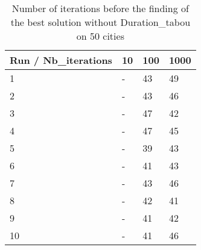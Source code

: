 \documentclass[12pt,oneside,a4paper]{article}
\begin{document}
    \begin{table}[h]
        \centering
        \small
        \begin{tabular}{llll}
          \hline
          \multicolumn{1}{|l|}{\textbf{Run / Nb\_iterations}}& \multicolumn{1}{l|}{\textbf{10}} & \multicolumn{1}{l|}{\textbf{100}} & \multicolumn{1}{l|}{\textbf{1000}}\\ \hline
          \multicolumn{1}{|l|}{1} & \multicolumn{1}{l|}{-}  & \multicolumn{1}{l|}{43}  & \multicolumn{1}{l|}{49}  \\ \hline
          \multicolumn{1}{|l|}{2} & \multicolumn{1}{l|}{-}  & \multicolumn{1}{l|}{43}  & \multicolumn{1}{l|}{46}  \\ \hline         
          \multicolumn{1}{|l|}{3} & \multicolumn{1}{l|}{-}  & \multicolumn{1}{l|}{47}  & \multicolumn{1}{l|}{42}  \\ \hline
          \multicolumn{1}{|l|}{4} & \multicolumn{1}{l|}{-}  & \multicolumn{1}{l|}{47}  & \multicolumn{1}{l|}{45}  \\ \hline
          \multicolumn{1}{|l|}{5} & \multicolumn{1}{l|}{-}  & \multicolumn{1}{l|}{39}  & \multicolumn{1}{l|}{43}  \\ \hline
          \multicolumn{1}{|l|}{6} & \multicolumn{1}{l|}{-}  & \multicolumn{1}{l|}{41}  & \multicolumn{1}{l|}{43}  \\ \hline
          \multicolumn{1}{|l|}{7} & \multicolumn{1}{l|}{-}  & \multicolumn{1}{l|}{43}  & \multicolumn{1}{l|}{46}  \\ \hline
          \multicolumn{1}{|l|}{8} & \multicolumn{1}{l|}{-}  & \multicolumn{1}{l|}{42}  & \multicolumn{1}{l|}{41}  \\ \hline
          \multicolumn{1}{|l|}{9} & \multicolumn{1}{l|}{-}  & \multicolumn{1}{l|}{41}  & \multicolumn{1}{l|}{42}  \\ \hline
          \multicolumn{1}{|l|}{10} & \multicolumn{1}{l|}{-}  & \multicolumn{1}{l|}{41}  & \multicolumn{1}{l|}{46}  \\ \hline
        \end{tabular}
        \caption{Number of iterations before the finding of the best solution without Duration\_tabou on 50 cities}
        \label{Performances scénario 0}
      \end{table}
\end{document}
